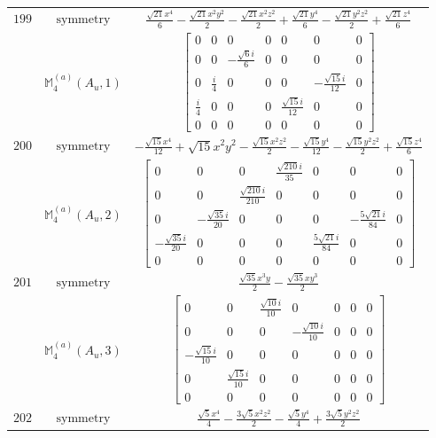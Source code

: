 \documentclass[fleqn,8pt,landscape]{jsarticle}
\begin{document}
\begin{longtable}{ccc}
$ 199 $ & $ \text{symmetry} $ & $ \frac{\sqrt{21} x^{4}}{6} - \frac{\sqrt{21} x^{2} y^{2}}{2} - \frac{\sqrt{21} x^{2} z^{2}}{2} + \frac{\sqrt{21} y^{4}}{6} - \frac{\sqrt{21} y^{2} z^{2}}{2} + \frac{\sqrt{21} z^{4}}{6} $ \\
$  $ & $ \mathbb{M}_{4}^{(a)}(A_{u},1) $ & $ \begin{bmatrix} 0 & 0 & 0 & 0 & 0 & 0 & 0 \\ 0 & 0 & - \frac{\sqrt{6} i}{6} & 0 & 0 & 0 & 0 \\ 0 & \frac{i}{4} & 0 & 0 & 0 & - \frac{\sqrt{15} i}{12} & 0 \\ \frac{i}{4} & 0 & 0 & 0 & \frac{\sqrt{15} i}{12} & 0 & 0 \\ 0 & 0 & 0 & 0 & 0 & 0 & 0 \end{bmatrix} $ \\ \hline
$ 200 $ & $ \text{symmetry} $ & $ - \frac{\sqrt{15} x^{4}}{12} + \sqrt{15} x^{2} y^{2} - \frac{\sqrt{15} x^{2} z^{2}}{2} - \frac{\sqrt{15} y^{4}}{12} - \frac{\sqrt{15} y^{2} z^{2}}{2} + \frac{\sqrt{15} z^{4}}{6} $ \\
$  $ & $ \mathbb{M}_{4}^{(a)}(A_{u},2) $ & $ \begin{bmatrix} 0 & 0 & 0 & \frac{\sqrt{210} i}{35} & 0 & 0 & 0 \\ 0 & 0 & \frac{\sqrt{210} i}{210} & 0 & 0 & 0 & 0 \\ 0 & - \frac{\sqrt{35} i}{20} & 0 & 0 & 0 & - \frac{5 \sqrt{21} i}{84} & 0 \\ - \frac{\sqrt{35} i}{20} & 0 & 0 & 0 & \frac{5 \sqrt{21} i}{84} & 0 & 0 \\ 0 & 0 & 0 & 0 & 0 & 0 & 0 \end{bmatrix} $ \\ \hline
$ 201 $ & $ \text{symmetry} $ & $ \frac{\sqrt{35} x^{3} y}{2} - \frac{\sqrt{35} x y^{3}}{2} $ \\
$  $ & $ \mathbb{M}_{4}^{(a)}(A_{u},3) $ & $ \begin{bmatrix} 0 & 0 & \frac{\sqrt{10} i}{10} & 0 & 0 & 0 & 0 \\ 0 & 0 & 0 & - \frac{\sqrt{10} i}{10} & 0 & 0 & 0 \\ - \frac{\sqrt{15} i}{10} & 0 & 0 & 0 & 0 & 0 & 0 \\ 0 & \frac{\sqrt{15} i}{10} & 0 & 0 & 0 & 0 & 0 \\ 0 & 0 & 0 & 0 & 0 & 0 & 0 \end{bmatrix} $ \\ \hline
$ 202 $ & $ \text{symmetry} $ & $ \frac{\sqrt{5} x^{4}}{4} - \frac{3 \sqrt{5} x^{2} z^{2}}{2} - \frac{\sqrt{5} y^{4}}{4} + \frac{3 \sqrt{5} y^{2} z^{2}}{2} $ \\

\end{longtable}
\end{document}
